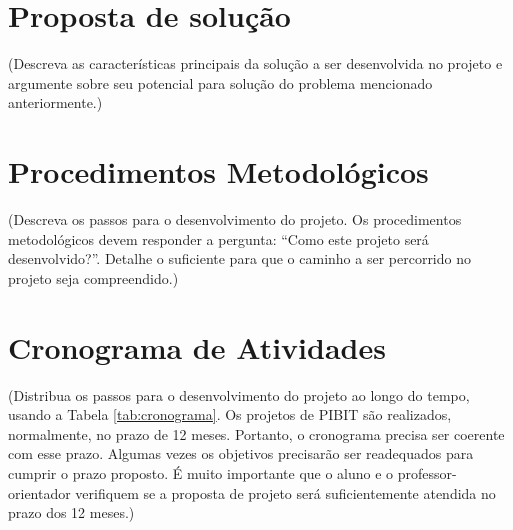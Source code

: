 \documentclass[11pt]{article}
\begin{document}
\section{Proposta de solução}
(Descreva as características principais da solução a ser desenvolvida no projeto e argumente
sobre seu potencial para solução do problema mencionado anteriormente.)


\section{Procedimentos Metodológicos}
(Descreva os passos para o desenvolvimento do projeto. Os procedimentos metodológicos
devem responder a pergunta: “Como este projeto será desenvolvido?”. Detalhe o suficiente
para que o caminho a ser percorrido no projeto seja compreendido.)


\section{Cronograma de Atividades}
(Distribua os passos para o desenvolvimento do projeto ao longo do tempo, usando a Tabela \ref{tab:cronograma}. Os projetos de PIBIT são realizados, normalmente, no prazo de 12 meses. Portanto, o
cronograma precisa ser coerente com esse prazo. Algumas vezes os objetivos precisarão ser
readequados para cumprir o prazo proposto. É muito importante que o aluno e o professor-
orientador verifiquem se a proposta de projeto será suficientemente atendida no prazo dos 12
meses.)
\end{document}
